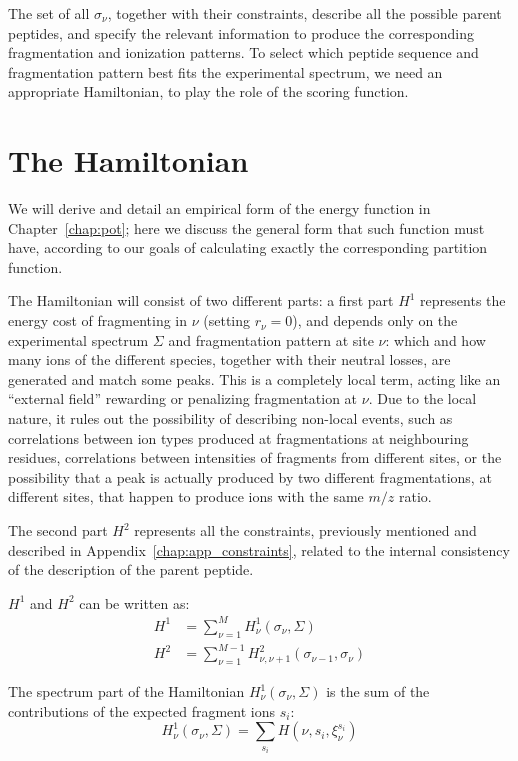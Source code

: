The set of all $\sigma_\nu$, together with their constraints, describe all the
possible parent peptides, and specify the relevant information to produce the
corresponding  fragmentation and ionization patterns.
To select which peptide sequence and fragmentation pattern best fits the
experimental spectrum, we need an appropriate Hamiltonian, to play the role of
the scoring function.

\section{The Hamiltonian}
\label{sec:hamiltonian}

We will derive and detail an empirical form of the energy function in
Chapter~\ref{chap:pot}; here we discuss the general form that such function must have,
according to our goals of calculating exactly the corresponding partition
function.


The Hamiltonian will consist of two different parts: 
a first part $H^1$ represents the energy cost of fragmenting in $\nu$ (setting
$r_\nu=0$), 
and depends only on the experimental spectrum $\Sigma$ and fragmentation pattern
at site $\nu$: which and how many ions of the different species, together with
their neutral losses, are generated and match some peaks. This is a completely
local term, acting like an  ``external field'' rewarding or penalizing
fragmentation at $\nu$.
Due to the local nature, it rules out the possibility of describing non-local
events, such as correlations between ion types produced at fragmentations at
neighbouring residues,  correlations between intensities of fragments from
different sites, or the possibility that a peak is actually produced by two
different fragmentations, at different sites, that happen to produce ions with
the same $m/z$ ratio.
  
The second part $H^2$ represents all the constraints, previously mentioned and
described in Appendix~\ref{chap:app_constraints}, related to the internal
consistency of the description of the parent peptide.

$H^1$ and $H^2$ can be written as:
\begin{align}
H^1 &= \sum_{\nu=1}^M H_\nu^1(\sigma_\nu,\Sigma)\\
H^2 &= \sum_{\nu=1}^{M-1}
H_{\nu,\nu+1}^2(\sigma_{\nu-1},\sigma_\nu)
\end{align}

The spectrum part of the Hamiltonian $H^1_\nu(\sigma_\nu,\Sigma)$ is the
sum of the contributions of the expected fragment ions $s_i$: 
\begin{equation}
H^1_\nu(\sigma_\nu,\Sigma)=
\sum_{s_i} H(\nu,s_i,\xi_\nu^{s_i})
\label{eq:h1}
\end{equation}


